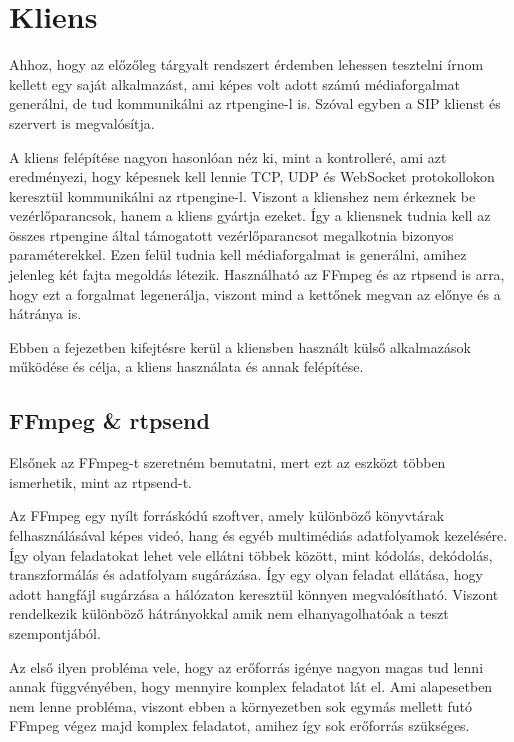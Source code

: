 \chapter{Kliens}

Ahhoz, hogy az előzőleg tárgyalt rendszert érdemben lehessen tesztelni írnom
kellett egy saját alkalmazást, ami képes volt adott számú médiaforgalmat 
generálni, de tud kommunikálni az rtpengine-l is. Szóval egyben a SIP
klienst és szervert is megvalósítja.

A kliens felépítése nagyon hasonlóan néz ki, mint a kontrolleré, ami azt 
eredményezi, hogy képesnek kell lennie  TCP, UDP és WebSocket protokollokon
keresztül kommunikálni az rtpengine-l. Viszont a klienshez nem érkeznek be 
vezérlőparancsok, hanem a kliens gyártja ezeket. Így a kliensnek tudnia kell
az összes rtpengine által támogatott vezérlőparancsot megalkotnia bizonyos 
paraméterekkel. Ezen felül tudnia kell médiaforgalmat is generálni, amihez
jelenleg két fajta megoldás létezik. Használható az FFmpeg és az rtpsend 
is arra, hogy ezt a forgalmat legenerálja, viszont mind a kettőnek megvan
az előnye és a hátránya is. 

Ebben a fejezetben kifejtésre kerül a kliensben használt külső alkalmazások
működése és célja, a kliens használata és annak felépítése. 

\section{FFmpeg \& rtpsend}

Elsőnek az FFmpeg-t szeretném bemutatni, mert ezt az eszközt többen ismerhetik,
mint az rtpsend-t. 

Az FFmpeg egy nyílt forráskódú szoftver, amely különböző könyvtárak felhasználásával
képes videó, hang és egyéb multimédiás adatfolyamok kezelésére. Így olyan feladatokat
lehet vele ellátni többek között, mint kódolás, dekódolás, transzformálás és 
adatfolyam sugárázása. Így egy olyan feladat ellátása, hogy adott hangfájl sugárzása a 
hálózaton keresztül könnyen megvalósítható. Viszont rendelkezik különböző hátrányokkal
amik nem elhanyagolhatóak a teszt szempontjából.

Az első ilyen probléma vele, hogy az erőforrás igénye nagyon magas tud lenni 
annak függvényében, hogy mennyire komplex feladatot lát el. Ami alapesetben nem lenne
probléma, viszont ebben a környezetben sok egymás mellett futó FFmpeg végez majd
komplex feladatot, amihez így sok erőforrás szükséges.

